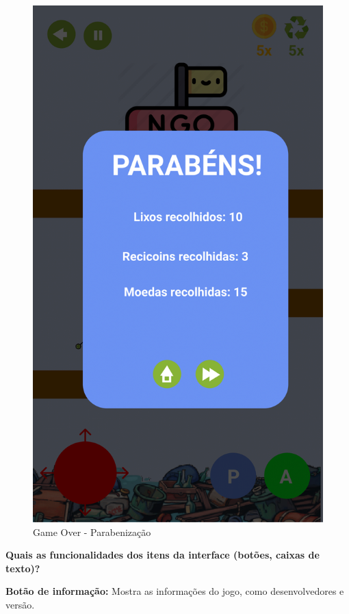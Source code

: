 \documentclass[]{scrartcl}
\begin{document}
\begin{figure}[H]
	\begin{center}
		\includegraphics[scale=0.3]{figs/Game Design-21.png}
		\caption{Game Over - Parabenização}
	\end{center}
\end{figure}

\noindent\textbf{Quais as funcionalidades dos itens da interface (botões, caixas de texto)?}

\textbf{Botão de informação:} Mostra as informações do jogo, como desenvolvedores e versão.
\end{document}
